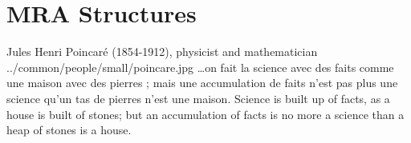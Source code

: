 ﻿%


\chapter{MRA Structures}
\qboxnpqt
  { Jules Henri Poincar\'e (1854-1912), physicist and mathematician
    \footnotemark
  }
  {../common/people/small/poincare.jpg}
  {\ldots on fait la science avec des faits comme une maison avec des pierres ; 
   mais une accumulation de faits n'est pas plus une science qu'un tas de 
   pierres n'est une maison.}
  {Science is built up of facts, as a house is built of stones;
   but an accumulation of facts is no more a science than a heap of stones is a house.}

